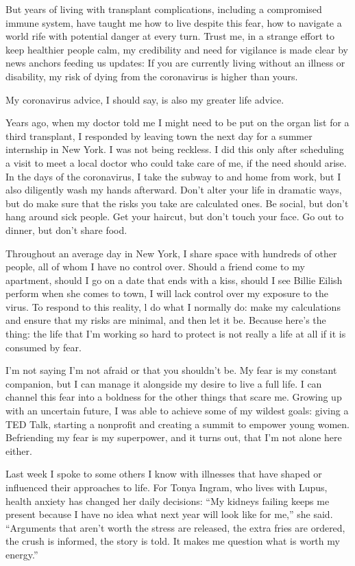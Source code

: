 But years of living with transplant complications, including a
compromised immune system, have taught me how to live despite this fear,
how to navigate a world rife with potential danger at every turn. Trust
me, in a strange effort to keep healthier people calm, my credibility
and need for vigilance is made clear by news anchors feeding us updates:
If you are currently living without an illness or disability, my risk of
dying from the coronavirus is higher than yours.

My coronavirus advice, I should say, is also my greater life advice.

Years ago, when my doctor told me I might need to be put on the organ
list for a third transplant, I responded by leaving town the next day
for a summer internship in New York. I was not being reckless. I did
this only after scheduling a visit to meet a local doctor who could take
care of me, if the need should arise. In the days of the coronavirus, I
take the subway to and home from work, but I also diligently wash my
hands afterward. Don't alter your life in dramatic ways, but do make
sure that the risks you take are calculated ones. Be social, but don't
hang around sick people. Get your haircut, but don't touch your face. Go
out to dinner, but don't share food.

Throughout an average day in New York, I share space with hundreds of
other people, all of whom I have no control over. Should a friend come
to my apartment, should I go on a date that ends with a kiss, should I
see Billie Eilish perform when she comes to town, I will lack control
over my exposure to the virus. To respond to this reality, l do what I
normally do: make my calculations and ensure that my risks are minimal,
and then let it be. Because here's the thing: the life that I'm working
so hard to protect is not really a life at all if it is consumed by
fear.

I'm not saying I'm not afraid or that you shouldn't be. My fear is my
constant companion, but I can manage it alongside my desire to live a
full life. I can channel this fear into a boldness for the other things
that scare me. Growing up with an uncertain future, I was able to
achieve some of my wildest goals: giving a TED Talk, starting a
nonprofit and creating a summit to empower young women. Befriending my
fear is my superpower, and it turns out, that I'm not alone here either.

Last week I spoke to some others I know with illnesses that have shaped
or influenced their approaches to life. For Tonya Ingram, who lives with
Lupus, health anxiety has changed her daily decisions: ``My kidneys
failing keeps me present because I have no idea what next year will look
like for me,'' she said. ``Arguments that aren't worth the stress are
released, the extra fries are ordered, the crush is informed, the story
is told. It makes me question what is worth my energy.''

